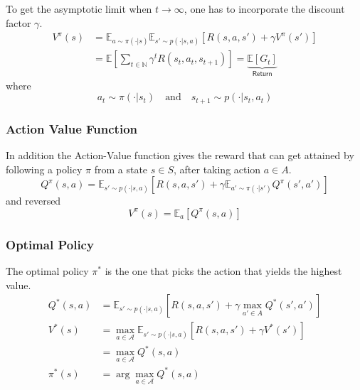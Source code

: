 \newpar{}

To get the asymptotic limit when $t \to \infty$, one has to incorporate the discount factor $\gamma$.
\begin{align*}
    V^{\pi}(s) & = \mathbb{E}_{a \sim \pi(\cdot|s)} \mathbb{E}_{s' \sim p(\cdot|s, a)} \left[R(s,a,s') + \gamma V^{\pi}(s')\right]                      \\
               & = \mathbb{E}\left[\sum_{t\in \mathbb{N}}\gamma^t R(s_t,a_t,s_{t+1})\right] = \underbrace{\mathbb{E}\left[G_t\right]}_{\textsf{Return}}
\end{align*}
where
\begin{equation*}
    a_t \sim \pi(\cdot | s_t) \quad \text{and} \quad s_{t+1}\sim p(\cdot | s_t,a_t)
\end{equation*}

\subsubsection{Action Value Function}
In addition the Action-Value function gives the reward that can get attained by following a policy $\pi$ from a state $s \in S$,
after taking action $a \in A$.
\begin{equation*}
    Q^\pi(s,a) = \mathbb{E}_{s' \sim p(\cdot|s,a)}\left[R(s,a,s')+\gamma \mathbb{E}_{a'\sim \pi(\cdot|s')} Q^\pi(s',a')\right]
\end{equation*}
and reversed
\begin{equation*}
    V^\pi(s) = \mathbb{E}_a \left[ Q^\pi (s,a)\right]
\end{equation*}

\subsubsection{Optimal Policy}
The optimal policy $\pi^*$ is the one that picks the action that yields the highest value.
\begin{align*}
    Q^*(s,a) & = \mathbb{E}_{s'\sim p(\cdot|s,a)}\left[R(s,a,s') + \gamma \max_{a'\in A}Q^* (s',a')\right]     \\
    V^*(s)   & = \max_{a\in \mathcal{A}}\mathbb{E}_{s'\sim p(\cdot|s,a)}\left[R(s,a,s')+\gamma V^* (s')\right] \\
             & = \max_{a\in \mathcal{A}} Q^{*}(s,a)                                                            \\  
    \pi^{*}(s)  & = \arg \max_{a\in \mathcal{A}} Q^{*}(s,a)
\end{align*}

